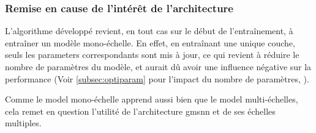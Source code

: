
\subsubsection{Remise en cause de l'intérêt de l'architecture}

L'algorithme développé revient, en tout cas sur le début de l'entraînement, à entraîner un modèle mono-échelle.
En effet, en entraînant une unique couche, seuls les \glspl{parameter} correspondants sont mis à jour, ce qui revient à réduire le nombre de paramètres du modèle, et aurait dû avoir une influence négative sur la performance (Voir \autoref{subsec:optiparam} pour l'impact du nombre de paramètres, ).

Comme le \gls{model} mono-échelle apprend aussi bien que le \gls{model} multi-échelles, cela remet en question l'utilité de l'architecture \gls{gmsnn} et de ses échelles multiples.
